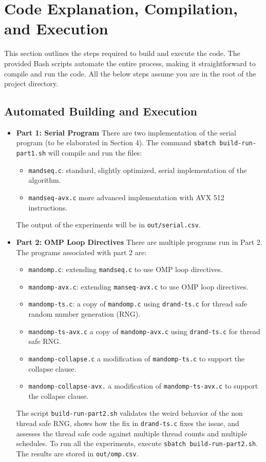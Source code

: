 \documentclass{article}
\begin{document}
\section{Code Explanation, Compilation, and Execution}

This section outlines the steps required to build and execute the code. The provided Bash scripts automate the entire process, 
making it straightforward to compile and run the code. All the below steps assume 
you are in the root of the project directory.

\subsection{Automated Building and Execution}
\begin{itemize}
    \item \textbf{Part 1: Serial Program} 
    There are two implementation of the serial program (to be elaborated in Section 4). 
    The command \texttt{sbatch build-run-part1.sh} will compile and run the files:
    \begin{itemize}
        \item \texttt{mandseq.c}: standard, slightly optimized, serial implementation of the algorithm.
        \item \texttt{mandseq-avx.c} more advanced implementation with AVX 512 instructions.
    \end{itemize}
    The output of the experiments will be in \texttt{out/serial.csv}.
    
    \item \textbf{Part 2: OMP Loop Directives}
    There are multiple programs run in Part 2. The programs associated with part 2 are:
    \begin{itemize}
        \item \texttt{mandomp.c}: extending \texttt{mandseq.c} to use OMP loop directives.
        \item \texttt{mandomp-avx.c}: extending \texttt{manseq-avx.c} to use OMP loop directives.
        \item \texttt{mandomp-ts.c}: a copy of \texttt{mandomp.c} using \texttt{drand-ts.c} for thread safe random number generation (RNG).
        \item \texttt{mandomp-ts-avx.c} a copy of \texttt{mandomp-avx.c} using \texttt{drand-ts.c} for thread safe RNG.
        \item \texttt{mandomp-collapse.c} a modification of \texttt{mandomp-ts.c} to support the collapse clause.
        \item \texttt{mandomp-collapse-avx.} a modification of \texttt{mandomp-ts-avx.c} to support the collapse clause.
    \end{itemize}
    The script \texttt{build-run-part2.sh} validates the weird behavior of the non thread safe RNG, shows how the fix 
    in \texttt{drand-ts.c} fixes the issue, and assesses the thread safe code against multiple thread counts and multiple 
    schedules. To run all the experiments, execute \texttt{sbatch build-run-part2.sh}. The results are stored in 
    \texttt{out/omp.csv}.


\end{itemize}
\end{document}
